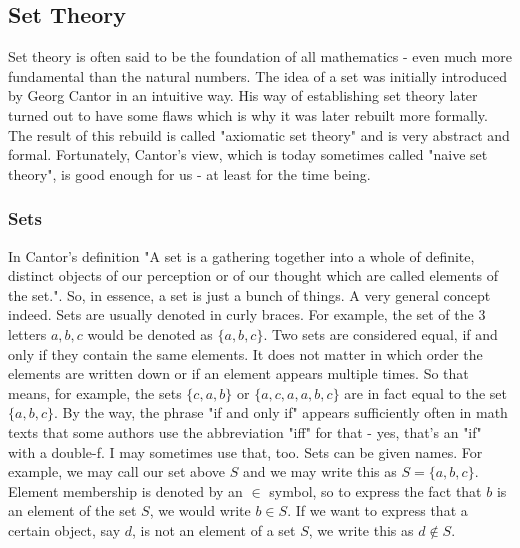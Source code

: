 

\subsection{Set Theory}
Set theory is often said to be the foundation of all mathematics - even much more fundamental than the natural numbers. 
The idea of a set was initially introduced by Georg Cantor in an intuitive way. His way of establishing set theory later turned out to have some flaws which is why it was later rebuilt more formally. The result of this rebuild is called "axiomatic set theory" and is very abstract and formal. Fortunately, Cantor's view, which is today sometimes called "naive set theory", is good enough for us - at least for the time being. 

\subsubsection{Sets}
In Cantor's definition "A set is a gathering together into a whole of definite, distinct objects of our perception or of our thought which are called elements of the set.". So, in essence, a set is just a bunch of things. A very general concept indeed. Sets are usually denoted in curly braces. For example, the set of the 3 letters $a,b,c$ would be denoted as $\{a,b,c\}$. Two sets are considered equal, if and only if they contain the same elements. It does not matter in which order the elements are written down or if an element appears multiple times. So that means, for example, the sets $\{c,a,b\}$ or $\{a,c,a,a,b,c\}$ are in fact equal to the set $\{a,b,c\}$. By the way, the phrase "if and only if" appears sufficiently often in math texts that some authors use the abbreviation "iff" for that - yes, that's an "if" with a double-f. I may sometimes use that, too. Sets can be given names. For example, we may call our set above $S$ and we may write this as $S = \{a,b,c\}$. Element membership is denoted by an $\in$ symbol, so to express the fact that $b$ is an element of the set $S$, we would write $b \in S$. If we want to express that a certain object, say $d$, is not an element of a set $S$, we write this as $d \notin S$.

